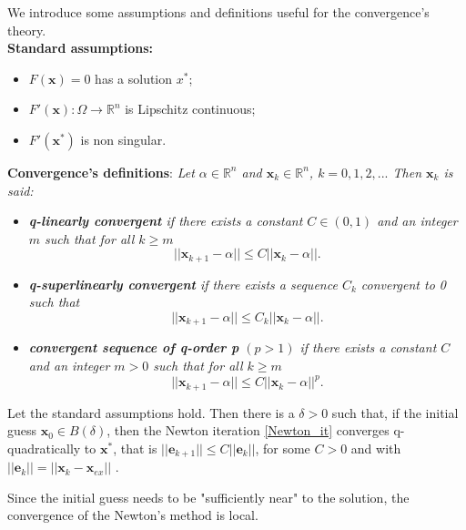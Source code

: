We introduce some assumptions and definitions useful for the convergence's theory.\\
\textbf{Standard assumptions:} 
\begin{itemize}
	\item $F(\textbf{x}) = 0$ has a solution ${x}^{*}$;
	\item $F'(\textbf{x}): \Omega \rightarrow \mathbb{R}^{n}$ is Lipschitz continuous;
	\item $F'({\textbf{x}}^{*})$ is non singular.
\end{itemize}
\noindent \textbf{Convergence's definitions}: \textit{ Let $\alpha \in \mathbb{R}^{n}$ and ${\textbf{x}}_{k} \in \mathbb{R}^{n}$, $k = 0,1,2,...$ Then ${\textbf{x}}_{k}$ is said:}
	
	\begin{itemize}
		\item \textit{ \textbf{q-linearly convergent} if there exists a constant $C \in (0,1)$ and an integer $m$ such that for all $k\geq m$ 
		\begin{equation*}
		||{\textbf{x}}_{k+1}-\alpha|| \leq C||{\textbf{x}}_{k}-\alpha|| .
		\end{equation*}	}
	    \item \textit{ \textbf{q-superlinearly convergent} if there exists a sequence ${{C}_{k}}$ convergent to 0 such that
		\begin{equation*}
		||{\textbf{x}}_{k+1}-\alpha|| \leq C_k||{\textbf{x}}_{k}-\alpha|| .
		\end{equation*}}
	
	\item \textit{ \textbf{convergent sequence of q-order p} $(p > 1)$ if there exists a
		constant $C$ and an integer $m > 0$ such that for all $k \geq m$
		\begin{equation*}
		||{\textbf{x}}_{k+1}-\alpha|| \leq C{||{\textbf{x}}_{k}-\alpha||}^{p} .
		\end{equation*}}
\end{itemize}

\begin{theorem}
	\label{converg}
 Let the standard assumptions hold. Then there is a $\delta > 0$ such that, if the initial guess ${\textbf{x}}_{0} \in \mathit{B(\delta)}$, then the Newton iteration \eqref{Newton_it} converges q-quadratically to ${\textbf{x}}^{*}$, that is $||{\textbf{e}}_{k+ 1}|| \leq C ||{\textbf{e}}_{k}||$, for some $ C > 0 $ and with $ ||{\textbf{e}}_{k}|| = ||{\textbf{x}}_{k} - \textbf{x}_{ex}|| $ .
\end{theorem}
Since the initial guess needs to be "sufficiently near" to the solution, the convergence of the Newton's method is local.\\

